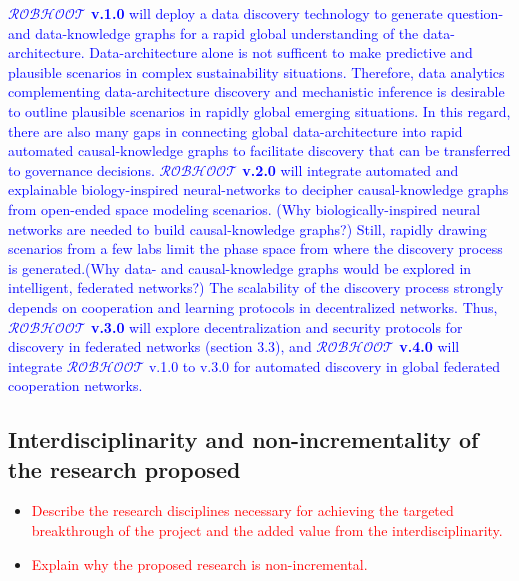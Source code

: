 \documentclass[12pt, a4paper]{article} %
\begin{document}
\textcolor{blue}{{\bf $\mathcal{ROBHOOT}$ v.1.0} will deploy a data
discovery technology to generate question- and data-knowledge graphs
for a rapid global understanding of the
data-architecture. Data-architecture alone is not sufficent to make
predictive and plausible scenarios in complex sustainability
situations. Therefore, data analytics complementing data-architecture
discovery and mechanistic inference is desirable to outline plausible
scenarios in rapidly global emerging situations. In this regard, there
are also many gaps in connecting global data-architecture into rapid
automated causal-knowledge graphs to facilitate discovery that can be
transferred to governance decisions. {\bf $\mathcal{ROBHOOT}$ v.2.0} will
integrate automated and explainable biology-inspired neural-networks
to decipher causal-knowledge graphs from open-ended space modeling
scenarios. (Why biologically-inspired neural networks are needed to
build causal-knowledge graphs?) Still, rapidly drawing scenarios from
a few labs limit the phase space from where the discovery process is
generated.(Why data- and causal-knowledge graphs would be explored in
intelligent, federated networks?) The scalability of the discovery
process strongly depends on cooperation and learning protocols in
decentralized networks. Thus, {\bf $\mathcal{ROBHOOT}$ v.3.0} will
explore decentralization and security protocols for discovery in
federated networks (section 3.3), and {\bf $\mathcal{ROBHOOT}$ v.4.0}
will integrate $\mathcal{ROBHOOT}$ v.1.0 to v.3.0 for automated
discovery in global federated cooperation networks.}

\subsection{Interdisciplinarity and non-incrementality of the research
  proposed}

\begin{itemize}
\item \textcolor{red}{Describe the research disciplines necessary for
    achieving the targeted breakthrough of the project and the added
    value from the interdisciplinarity.}
\item \textcolor{red}{Explain why the proposed research is
    non-incremental.}
  \end{itemize}
\end{document}
